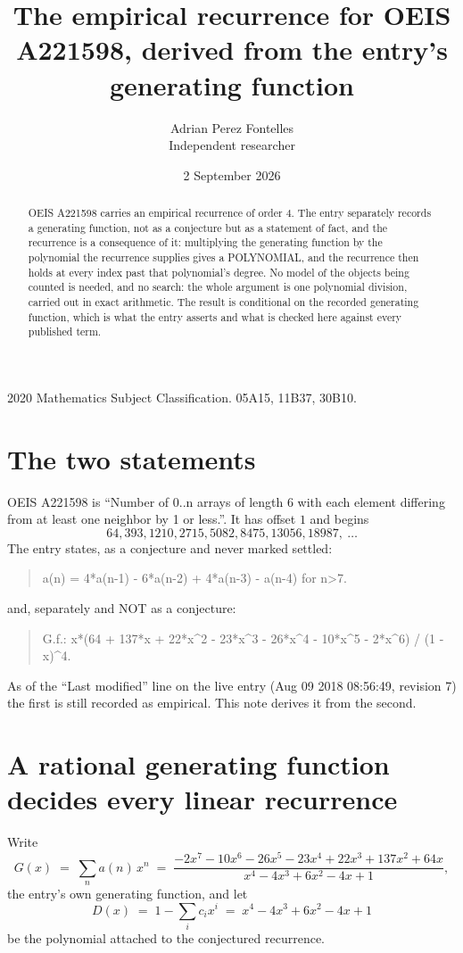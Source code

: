 \documentclass[11pt,a4paper]{article}
\title{The empirical recurrence for OEIS A221598, derived from the entry's generating function}
\author{Adrian Perez Fontelles\\ \small Independent researcher}
\date{2 September 2026}
\theoremstyle{plain}
\theoremstyle{definition}
\begin{document}
\maketitle

\begin{abstract}
OEIS A221598 carries an empirical recurrence of order $4$. The entry separately records a
generating function, not as a conjecture but as a statement of fact, and the recurrence is a
consequence of it: multiplying the generating function by the polynomial the recurrence
supplies gives a POLYNOMIAL, and the recurrence then holds at every index past that
polynomial's degree. No model of the objects being counted is needed, and no search: the
whole argument is one polynomial division, carried out in exact arithmetic. The result is
conditional on the recorded generating function, which is what the entry asserts and what is
checked here against every published term.
\end{abstract}

\noindent\small 2020 Mathematics Subject Classification. 05A15, 11B37, 30B10.\normalsize

\section{The two statements}

OEIS A221598 is ``Number of 0..n arrays of length 6 with each element differing from at least one neighbor by 1 or less.''. It has offset $1$ and begins
\[
64, 393, 1210, 2715, 5082, 8475, 13056, 18987,\ \dots
\]
The entry states, as a conjecture and never marked settled:
\begin{quote}
a(n) = 4*a(n-1) - 6*a(n-2) + 4*a(n-3) - a(n-4) for n>7.
\end{quote}
and, separately and NOT as a conjecture:
\begin{quote}
G.f.: x*(64 + 137*x + 22*x\^{}2 - 23*x\^{}3 - 26*x\^{}4 - 10*x\^{}5 - 2*x\^{}6) / (1 - x)\^{}4.
\end{quote}
As of the ``Last modified'' line on the live entry (Aug 09 2018 08:56:49, revision 7) the first is still
recorded as empirical. This note derives it from the second.

\section{A rational generating function decides every linear recurrence}

Write
\[
G(x)\;=\;\sum_{n}a(n)\,x^{n}\;=\;\frac{- 2 x^{7} - 10 x^{6} - 26 x^{5} - 23 x^{4} + 22 x^{3} + 137 x^{2} + 64 x}{x^{4} - 4 x^{3} + 6 x^{2} - 4 x + 1},
\]
the entry's own generating function, and let
\[
D(x)\;=\;1-\sum_i c_i x^{i}\;=\;x^{4} - 4 x^{3} + 6 x^{2} - 4 x + 1
\]
be the polynomial attached to the conjectured recurrence.
\end{document}
